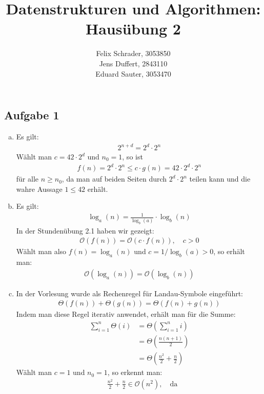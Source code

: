 \documentclass[11pt]{article}
\author{
  Felix Schrader, 3053850 \\ 
  Jens Duffert, 2843110 \\
  Eduard Sauter, 3053470
}
\title{Datenstrukturen und Algorithmen: Haus\"ubung 2}
\begin{document}
\maketitle
\subsection*{Aufgabe 1}

\begin{enumerate}[a)]
  \item Es gilt:
    \begin{align*}
      2^{n+d} = 2^d \cdot 2^n
    \end{align*}
    Wählt man $c = 42 \cdot 2^d$ und $n_0 = 1$, so ist
    \begin{align*}
      f(n)=2^d \cdot 2^n \leq c \cdot g(n) = 42 \cdot 2^d \cdot 2^n
    \end{align*}
    für alle $n \geq n_0$, da man auf beiden Seiten durch $2^d \cdot 2^n$ teilen
    kann und die wahre Aussage $1 \leq 42$ erhält.
  \item Es gilt:
    \begin{align*}
      \log_a (n) = \frac{1}{\log_b (a)} \cdot \log_b (n)
    \end{align*}
    In der Stundenübung 2.1 haben wir gezeigt:
    \begin{align*}
      \mathcal{O}(f(n)) = \mathcal{O}(c \cdot f(n)), \quad c > 0
    \end{align*}
    Wählt man also $f(n) = \log_a (n)$ und $c = 1/\log_b (a) > 0$, so
    erhält man:
    \begin{align*}
      \mathcal{O}(\log_a (n)) = \mathcal{O}(\log_b (n))
    \end{align*}
  \item In der Vorlesung wurde als Rechenregel für Landau-Symbole eingeführt:
    \begin{align*}
      \Theta (f(n)) + \Theta (g(n)) = \Theta (f(n)+g(n))
    \end{align*}
    Indem man diese Regel iterativ anwendet, erhält man für die Summe:
    \begin{align*}
      \sum_{i=1}^n \Theta (i) &= \Theta \left(\sum_{i=1}^n i\right)
      \\ &= \Theta \left(\frac{n(n+1)}{2}\right)
      \\ &= \Theta \left(\frac{n^2}{2} + \frac{n}{2}\right)
    \end{align*}
    Wählt man $c = 1$ und $n_0 = 1$, so erkennt man:
    \begin{align*}
      &\frac{n^2}{2} + \frac{n}{2} \in \mathcal{O}(n^2),\quad\text{da}

\end{align*}
\end{enumerate}
\end{document}
